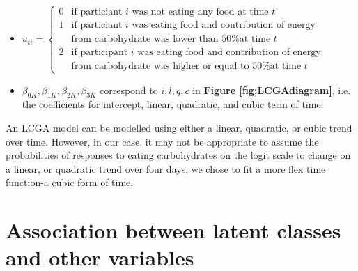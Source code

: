 \begin{itemize}
	\item $u_{ti}=\left\{ \begin{array}{ll}  0 & \text{if particiant } i \text{ was not eating any food at time } t\\ 
	 1 & \text{if particiant } i \text{ was eating food and contribution of energy} \\ 
	   &  \text{from carbohydrate was lower than 50\% at time } t \\ 
	 2 & \text{if participant } i \text{ was eating food and contribution of energy} \\ 
	 &  \text{from carbohydrate was higher or equal to 50\% at time } t \end{array} \right.$
	\item $\beta_{0K}, \beta_{1K}, \beta_{2K}, \beta_{3K}$  correspond to $i, l, q, c$ in \textbf{Figure \ref{fig:LCGAdiagram}}, i.e. the coefficients for intercept, linear, quadratic, and cubic term of time.
\end{itemize}

An LCGA model can be modelled using either a linear, quadratic, or cubic trend over time. However, in our case, it may not be appropriate to assume the probabilities of responses to eating carbohydrates on the logit scale to change on a linear, or quadratic trend over four days, we chose to fit a more flex time function-a cubic form of time.

\section{Association between latent classes and other variables}\vspace{-0.3cm}